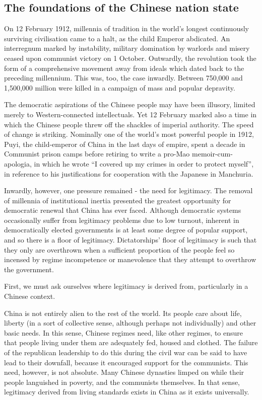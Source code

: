\documentclass[1opt,a4paper]{article}
\begin{document}
\begin{multicols}{2}
\subsection{The foundations of the Chinese nation state}

On 12 February 1912, millennia of tradition in the world’s longest continuously surviving civilisation came to a halt, as the child Emperor abdicated. An interregnum marked by instability, military domination by warlords and misery ceased upon communist victory on 1 October. Outwardly, the revolution took the form of a comprehensive movement away from ideals which dated back to the preceding millennium. This was, too, the case inwardly. Between 750,000 and 1,500,000 million were killed in a campaign of mass and popular depravity\cite{puyi_autobio}.

The democratic aspirations of the Chinese people may have been illusory, limited merely to Western-connected intellectuals. Yet 12 February marked also a time in which the Chinese people threw off the shackles of imperial authority. The speed of change is striking. Nominally one of the world’s most powerful people in 1912, Puyi, the child-emperor of China in the last days of empire, spent a decade in Communist prison camps before retiring to write a pro-Mao memoir-cum-apologia, in which he wrote ``I covered up my crimes in order to protect myself”\cite{cultural_revolution}, in reference to his justifications for cooperation with the Japanese in Manchuria.

Inwardly, however, one pressure remained - the need for legitimacy. The removal of millennia of institutional inertia presented the greatest opportunity for democratic renewal that China has ever faced. Although democratic systems occasionally suffer from legitimacy problems due to low turnout, inherent in democratically elected governments is at least some degree of popular support, and so there is a floor of legitimacy. Dictatorships' floor of legitimacy is such that they only are overthrown when a sufficient proportion of the people feel so incensed by regime incompetence or manevolence that they attempt to overthrow the government.

First, we must ask ourselves where legitimacy is derived from, particularly in a Chinese context.

China is not entirely alien to the rest of the world. Its people care about life, liberty (in a sort of collective sense, although perhaps not individually) and other basic needs. In this sense, Chinese regimes need, like other regimes, to ensure that people living under them are adequately fed, housed and clothed. The failure of the republican leadership to do this during the civil war can be said to have lead to their downfall, because it encouraged support for the communists. This need, however, is not absolute. Many Chinese dynasties limped on while their people languished in poverty, and the communists themselves. In that sense, legitimacy derived from living standards exists in China as it exists universally.


\end{multicols}
\end{document}
